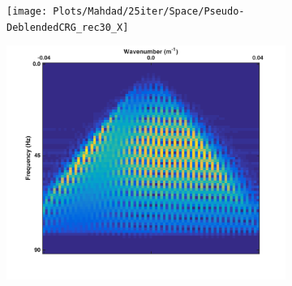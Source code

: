 \begin{figure}
\begin{subfigure}[b]{0.3\textwidth}
		\caption{}
		\label{fig:Ch-Theory-PseudoCRG-IncoherentDelay}
	\end{subfigure}
	\centering
	\begin{subfigure}[b]{0.3\textwidth}
		\centering
		\texttt{[image: Plots/Mahdad/25iter/Space/Pseudo-DeblendedCRG\_rec30\_X]}
		\caption{}
		\label{fig:Ch-Theory-PseudoCRG-IncoherentSpace}
	\end{subfigure}

	\centering
	\begin{subfigure}[b]{0.3\textwidth}
		\centering
		\includegraphics[width = \textwidth]{Plots/Mahdad/25iter/TimeDelay/FK-Pseudo-deblendedCRG_rec30_coh}
		\caption{}
		\label{fig:Ch-Theory-PseudoCRG-FK-CoherentDelay}
		

\end{subfigure}
\end{figure}
